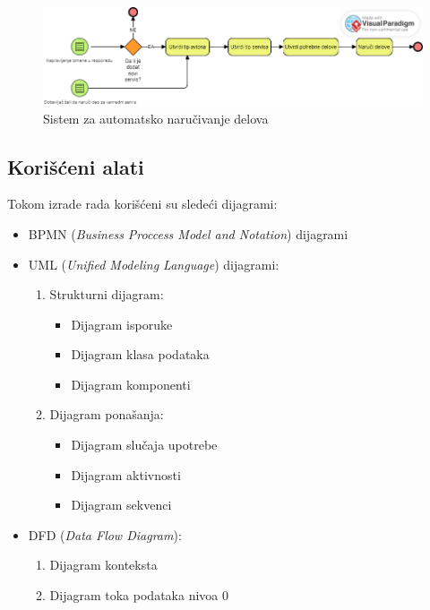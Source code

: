 \documentclass[a4paper]{article}
\begin{document}
\begin{figure}[H]
\begin{center}
\includegraphics[scale=0.55, width = 1.1\textwidth]{Dijagrami/BPMN_Dijagrami/BPMN_automatsko_narucivanje.png}
\end{center}
\caption{Sistem za automatsko naručivanje delova}
\label{fig:bpmn_automatsko_narucivanje}
\end{figure}

\subsection{Korišćeni alati}
\label{subsec:korisceni_alati}
Tokom izrade rada korišćeni su sledeći dijagrami:
    \begin{itemize}
        \item BPMN (\textit{Business Proccess Model and Notation}) dijagrami
        \item UML (\textit{Unified Modeling Language}) dijagrami:
            \begin{enumerate}
                \item Strukturni dijagram:
                    \begin{itemize}
                        \item Dijagram isporuke
                        \item Dijagram klasa podataka
                        \item Dijagram komponenti
                    \end{itemize}
                \item Dijagram ponašanja:
                    \begin{itemize}
                        \item Dijagram slučaja upotrebe
                        \item Dijagram aktivnosti
                        \item Dijagram sekvenci
                    \end{itemize}
            \end{enumerate}
        \item DFD (\textit{Data Flow Diagram}):
            \begin{enumerate}
                \item Dijagram konteksta
                \item Dijagram toka podataka nivoa 0
            \end{enumerate}
    \end{itemize}
\end{document}
